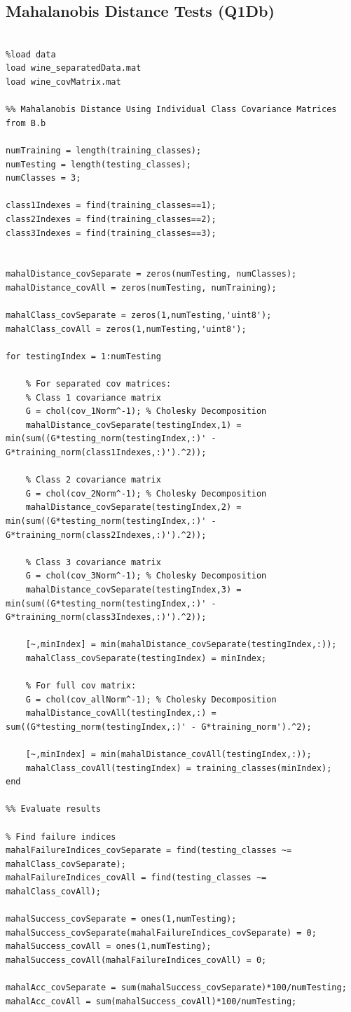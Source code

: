 \documentclass[10pt,twocolumn,letterpaper]{article}
\begin{document}
\subsection{Mahalanobis Distance Tests (Q1Db)}
{
\begin{lstlisting}

%load data
load wine_separatedData.mat
load wine_covMatrix.mat

%% Mahalanobis Distance Using Individual Class Covariance Matrices from B.b

numTraining = length(training_classes);
numTesting = length(testing_classes);
numClasses = 3;

class1Indexes = find(training_classes==1);
class2Indexes = find(training_classes==2);
class3Indexes = find(training_classes==3);


mahalDistance_covSeparate = zeros(numTesting, numClasses);
mahalDistance_covAll = zeros(numTesting, numTraining);

mahalClass_covSeparate = zeros(1,numTesting,'uint8');
mahalClass_covAll = zeros(1,numTesting,'uint8');

for testingIndex = 1:numTesting 

    % For separated cov matrices:     
    % Class 1 covariance matrix
    G = chol(cov_1Norm^-1); % Cholesky Decomposition
    mahalDistance_covSeparate(testingIndex,1) = min(sum((G*testing_norm(testingIndex,:)' - G*training_norm(class1Indexes,:)').^2));
    
    % Class 2 covariance matrix
    G = chol(cov_2Norm^-1); % Cholesky Decomposition
    mahalDistance_covSeparate(testingIndex,2) = min(sum((G*testing_norm(testingIndex,:)' - G*training_norm(class2Indexes,:)').^2));

    % Class 3 covariance matrix
    G = chol(cov_3Norm^-1); % Cholesky Decomposition
    mahalDistance_covSeparate(testingIndex,3) = min(sum((G*testing_norm(testingIndex,:)' - G*training_norm(class3Indexes,:)').^2));

    [~,minIndex] = min(mahalDistance_covSeparate(testingIndex,:));
    mahalClass_covSeparate(testingIndex) = minIndex;
    
    % For full cov matrix:   
    G = chol(cov_allNorm^-1); % Cholesky Decomposition
    mahalDistance_covAll(testingIndex,:) = sum((G*testing_norm(testingIndex,:)' - G*training_norm').^2);
    
    [~,minIndex] = min(mahalDistance_covAll(testingIndex,:));
    mahalClass_covAll(testingIndex) = training_classes(minIndex);
end

%% Evaluate results

% Find failure indices
mahalFailureIndices_covSeparate = find(testing_classes ~= mahalClass_covSeparate);
mahalFailureIndices_covAll = find(testing_classes ~= mahalClass_covAll);

mahalSuccess_covSeparate = ones(1,numTesting);
mahalSuccess_covSeparate(mahalFailureIndices_covSeparate) = 0;
mahalSuccess_covAll = ones(1,numTesting);
mahalSuccess_covAll(mahalFailureIndices_covAll) = 0;

mahalAcc_covSeparate = sum(mahalSuccess_covSeparate)*100/numTesting;
mahalAcc_covAll = sum(mahalSuccess_covAll)*100/numTesting;
\end{lstlisting}
}
\end{document}
